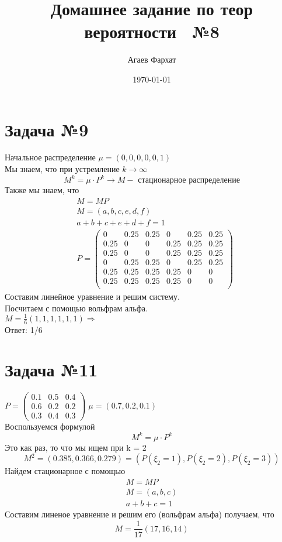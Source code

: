 \documentclass[a4paper, 12pt]{article} %
\author{Агаев Фархат}
\title{Домашнее задание по теор вероятности  №8}
\date{\today}
\begin{document}

\maketitle
\section*{Задача  №9}
Начальное распределение $\mu = (0, 0, 0, 0, 0, 1)$  \\
Мы знаем, что при устремление $k \rightarrow \infty $ \[
    M^k = \mu \cdot P^k \rightarrow M  -  \text{ стационарное распределение}
\] 
Также мы знаем, что \begin{align*}
    &M = M P \\ 
    &M = (a, b, c, e, d, f) \\ 
    &a + b + c + e + d + f= 1 \\ 
    &P = \begin{pmatrix}
        0 & 0.25 & 0.25 & 0 & 0.25 & 0.25\\
        0.25 & 0& 0 & 0.25 & 0.25 & 0.25 \\
        0.25 & 0& 0 & 0.25 & 0.25 & 0.25 \\
        0 & 0.25 & 0.25 & 0 & 0.25 & 0.25\\
        0.25 & 0.25 & 0.25 & 0.25 & 0 & 0\\
        0.25 & 0.25 & 0.25 & 0.25 & 0 & 0\\
    \end{pmatrix}
\end{align*}
Составим линейное уравнение и решим систему. \\
Посчитаем с помощью вольфрам альфа.  \\
$M = \frac{1}{6}(1, 1, 1, 1, 1, 1 ) \Rightarrow$ \\
Ответ: 1/6 


\section*{Задача  №11}
$ P = \begin{pmatrix}
    0.1 & 0.5 & 0.4\\
    0.6 & 0.2 & 0.2 \\
    0.3 & 0.4 & 0.3
\end{pmatrix}
\; \mu = (0.7, 0.2, 0.1)
$ \\
Воспользуемся формулой 
\[M^k = \mu \cdot P^k
    \]
Это как раз, то что мы ищем при k = 2
\[M^2 = (0.385, 0.366, 0.279 ) = 
(P(\xi_2 = 1), P(\xi_2 = 2), P(\xi_2 = 3))
\]
Найдем стационарное с помощью 
\begin{align*}
    M = M P \\ 
    M = (a, b, c) \\ 
    a + b + c = 1
\end{align*}
Составим линеное уравнение и решим его (вольфрам альфа)
получаем, что \[M = \frac{1}{17}(17,16,14)\]
\end{document}
